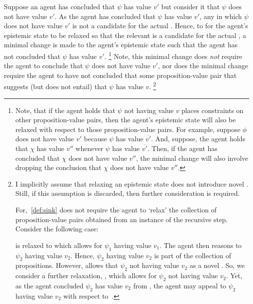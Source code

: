 \begin{note}
  Suppose an agent has concluded that \(\psi\) has value \(v'\) but consider it \epPAd{} that \(\psi\) does not have value \(v'\).
  As the agent has concluded that \(\psi\) has value \(v'\), any \epP{} in which \(\psi\) does not have value \(v'\) is not a candidate for the actual \world{}.
  Hence, to for the agent's epistemic state to be relaxed so that the relevant \epPAd{} \world{} is a candidate for the actual \world{}, a minimal change is made to the agent's epistemic state such that the agent has not concluded that \(\psi\) has value \(v'\).\nolinebreak
  \footnote{
    Note, that if the agent holds that \(\psi\) not having value \(v\) places constraints on other proposition-value pairs, then the agent's epistemic state will also be relaxed with respect to those proposition-value pairs.
    For example, suppose \(\phi\) does not have value \(v'\) because \(\psi\) has value \(\overline{v'}\).
    And, suppose, the agent holds that \(\chi\) has value \(v''\) whenever \(\psi\) has value \(\overline{v'}\).
    Then, if the agent has concluded that \(\chi\) does not have value \(v''\), the minimal change will also involve dropping the conclusion that \(\chi\) does not have value \(v''\).
  }
  Note, this minimal change does \emph{not} require the agent to conclude that \(\psi\) does not have value \(v'\), nor does the minimal change require the agent to have not concluded that some proposition-value pair that suggests (but does not entail) that \(\psi\) has value \(v\).\nolinebreak
  \footnote{
    I implicitly assume that relaxing an epistemic state does not introduce novel \epPAd{} .
    Still, if this assumption is discarded, then further consideration is required.

    For,~\autoref{def:sink} does not require the agent to `relax' the collection of proposition-value pairs obtained from an instance of the recursive step.
    Consider the following case:

    \eState{} is relaxed to  which allows for \(\psi_{1}\) having value \(v_{1}\).
    The agent then reasons to \(\psi_{2}\) having value \(v_{2}\).
    Hence, \(\psi_{2}\) having value \(v_{2}\) is part of the collection of propositions.
    However,  allows that \(\psi_{2}\) not having value \(v_{2}\) as a novel \epPAd{}.
    So, we consider a further relaxation, , which allows for \(\psi_{2}\) not having value \(v_{2}\).
    Yet, as the agent concluded \(\psi_{2}\) has value \(v_{2}\) from , the agent may appeal to \(\psi_{2}\) having value \(v_{2}\) with respect to~.

}
\end{note}
